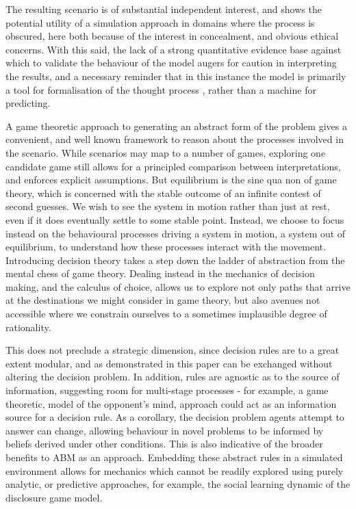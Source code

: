 \documentclass[graybox]{svmult}
\begin{document}
The resulting scenario is of substantial independent interest, and shows the potential utility of a simulation approach in domains where the process is obscured, here both because of the interest in concealment, and obvious ethical concerns. With this said, the lack of a strong quantitative evidence base against which to validate the behaviour of the model augers for caution in interpreting the results, and a necessary reminder that in this instance the model is primarily a tool for formalisation of the thought process \citep{epstein2008}, rather than a machine for predicting.


A game theoretic approach to generating an abstract form of the problem gives a convenient, and well known framework to reason about the processes involved in the scenario. While scenarios may map to a number of games, exploring one candidate game still allows for a principled comparison between interpretations, and enforces explicit assumptions. But equilibrium is the sine qua non of game theory, which is concerned with the stable outcome of an infinite contest of second guesses.
We wish to see the system in motion rather than just at rest, even if it does eventually settle to some stable point. Instead, we choose to focus instead on the behavioural processes driving a system in motion, a system out of equilibrium, to understand how these processes interact with the movement.
Introducing decision theory takes a step down the ladder of abstraction from the mental chess of game theory. Dealing instead in the mechanics of decision making, and the calculus of choice, allows us to explore not only paths that arrive at the destinations we might consider in game theory, but also avenues not accessible where we constrain ourselves to a sometimes implausible degree of rationality.

This does not preclude a strategic dimension, since decision rules are to a great extent modular, and as demonstrated in this paper can be exchanged without altering the decision problem. In addition, rules are agnostic as to the source of information, suggesting room for multi-stage processes - for example, a game theoretic, model of the opponent's mind, approach could act as an information source for a decision rule.  As a corollary, the decision problem agents attempt to answer can change, allowing behaviour in novel problems to be informed by beliefs derived under other conditions. This is also indicative of the broader benefits to \ac{ABM} as an approach. Embedding these abstract rules in a simulated environment allows for mechanics which cannot be readily explored using purely analytic, or predictive approaches, for example, the social learning dynamic of the disclosure game model.
\end{document}

